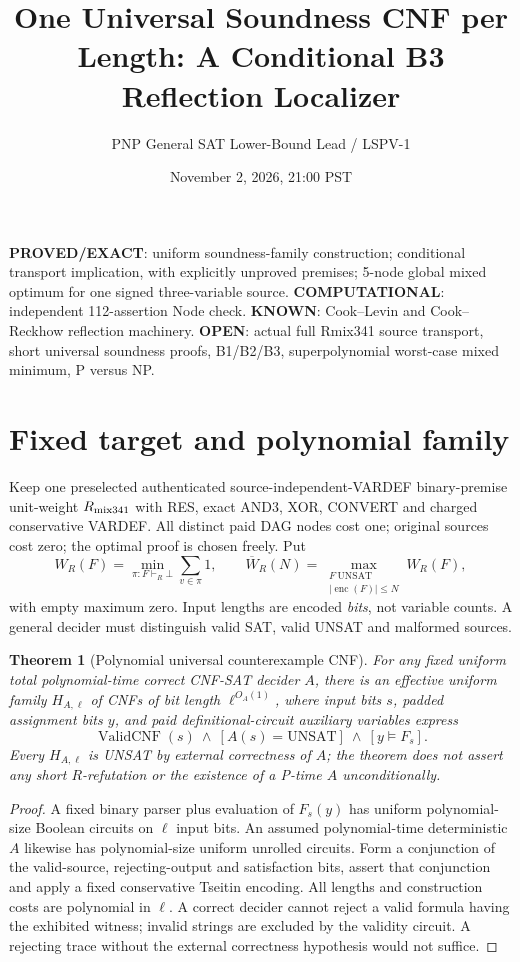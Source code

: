 \documentclass[11pt]{article}
\title{One Universal Soundness CNF per Length: A Conditional B3 Reflection Localizer}
\author{PNP General SAT Lower-Bound Lead / LSPV-1}
\date{November 2, 2026, 21:00 PST}
\newtheorem{theorem}{Theorem}
\begin{document}
\maketitle
\noindent\textbf{PROVED/EXACT}: uniform soundness-family construction; conditional transport implication, with explicitly unproved premises; 5-node global mixed optimum for one signed three-variable source. \textbf{COMPUTATIONAL}: independent 112-assertion Node check. \textbf{KNOWN}: Cook--Levin and Cook--Reckhow reflection machinery. \textbf{OPEN}: actual full Rmix341 source transport, short universal soundness proofs, B1/B2/B3, superpolynomial worst-case mixed minimum, P versus NP.
\section*{Fixed target and polynomial family}
Keep one preselected authenticated source-independent-VARDEF binary-premise unit-weight $R_{\rm mix341}$ with RES, exact AND3, XOR, CONVERT and charged conservative VARDEF. All distinct paid DAG nodes cost one; original sources cost zero; the optimal proof is chosen freely. Put
\[
W_R(F)=\min_{\pi:F\vdash_R\bot}\sum_{v\in\pi}1,\qquad
\overline W_R(N)=\max_{\substack{F\ \mathrm{UNSAT}\\|\operatorname{enc}(F)|\le N}}W_R(F),
\]
with empty maximum zero. Input lengths are encoded \emph{bits}, not variable counts. A general decider must distinguish valid SAT, valid UNSAT and malformed sources.
\begin{theorem}[Polynomial universal counterexample CNF]
For any fixed uniform total \emph{polynomial-time correct} CNF-SAT decider $A$, there is an effective uniform family $H_{A,\ell}$ of CNFs of bit length $\ell^{O_A(1)}$, where input bits $s$, padded assignment bits $y$, and paid definitional-circuit auxiliary variables express
\[
\operatorname{ValidCNF}(s)\ \wedge\ [A(s)=\mathrm{UNSAT}]
\ \wedge\ [y\models F_s].
\tag{1}
\]
Every $H_{A,\ell}$ is UNSAT by \emph{external correctness of $A$}; the theorem does not assert any short $R$-refutation or the existence of a P-time $A$ unconditionally.
\end{theorem}
\begin{proof}
A fixed binary parser plus evaluation of $F_s(y)$ has uniform polynomial-size Boolean circuits on $\ell$ input bits. An assumed polynomial-time deterministic $A$ likewise has polynomial-size uniform unrolled circuits. Form a conjunction of the valid-source, rejecting-output and satisfaction bits, assert that conjunction and apply a fixed conservative Tseitin encoding. All lengths and construction costs are polynomial in $\ell$. A correct decider cannot reject a valid formula having the exhibited witness; invalid strings are excluded by the validity circuit. A rejecting trace without the external correctness hypothesis would not suffice.
\end{proof}
\end{document}

